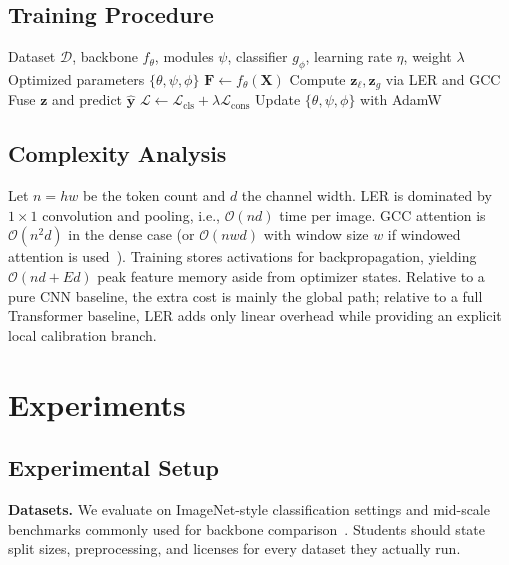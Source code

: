 \documentclass[11pt,a4paper]{article}
\begin{document}
\subsection{Training Procedure}
\label{sec:train}
\begin{algorithm}[t]
\caption{Training procedure of DPCNet}
\label{alg:train}
\begin{algorithmic}[1]
\Require Dataset $\mathcal{D}$, backbone $f_{\theta}$, modules $\psi$, classifier $g_{\phi}$, learning rate $\eta$, weight $\lambda$
\Ensure Optimized parameters $\{\theta,\psi,\phi\}$
    \State $\mathbf{F}\leftarrow f_{\theta}(\mathbf{X})$
    \State Compute $\mathbf{z}_{\ell},\mathbf{z}_{g}$ via LER and GCC
    \State Fuse $\mathbf{z}$ and predict $\hat{\mathbf{y}}$
    \State $\mathcal{L}\leftarrow\mathcal{L}_{\mathrm{cls}}+\lambda\mathcal{L}_{\mathrm{cons}}$
    \State Update $\{\theta,\psi,\phi\}$ with AdamW~\cite{loshchilov2019adamw}
  \EndFor
\EndFor
\end{algorithmic}
\end{algorithm}

\subsection{Complexity Analysis}
\label{sec:complexity}
Let $n=hw$ be the token count and $d$ the channel width.
LER is dominated by $1\times1$ convolution and pooling, i.e., $\mathcal{O}(nd)$ time per image.
GCC attention is $\mathcal{O}(n^{2}d)$ in the dense case (or $\mathcal{O}(nwd)$ with window size $w$ if windowed attention is used~\cite{liu2021swin}).
Training stores activations for backpropagation, yielding $\mathcal{O}(nd+Ed)$ peak feature memory aside from optimizer states.
Relative to a pure CNN baseline, the extra cost is mainly the global path; relative to a full Transformer baseline, LER adds only linear overhead while providing an explicit local calibration branch.

\section{Experiments}
\label{sec:exp}

\subsection{Experimental Setup}
\label{sec:setup}
\textbf{Datasets.}
We evaluate on ImageNet-style classification settings and mid-scale benchmarks commonly used for backbone comparison~\cite{deng2009imagenet}.
Students should state split sizes, preprocessing, and licenses for every dataset they actually run.
\end{document}
